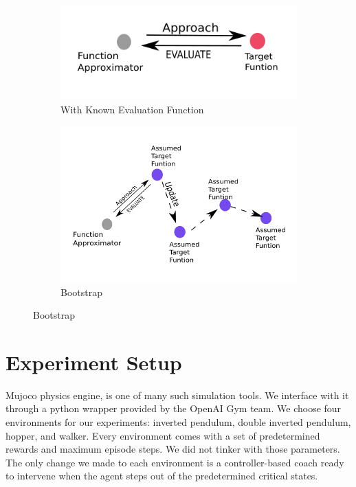 \documentclass[journal]{IEEEtran}
\begin{document}
\begin{figure}
\centering
\begin{subfigure}{0.2\textwidth}
  \centering
  \includegraphics[width=\linewidth]{onego.png}
  \caption{With Known Evaluation Function}
  \label{fig:known}
\end{subfigure}%
\begin{subfigure}{.3\textwidth}
  \centering
  \includegraphics[width=\linewidth]{bootstrap.png}
  \caption{Bootstrap}
  \label{fig:unknown}
\end{subfigure}
\label{fig:bootstrap}
\end{figure}



\section{Experiment Setup}
Mujoco physics engine\cite{6386109}, is one of many such simulation tools. We interface with it through a python wrapper provided by the OpenAI Gym\cite{Brockman2016OpenAIG} team. We choose four environments for our experiments: inverted pendulum, double inverted pendulum, hopper, and walker. Every environment comes with a set of predetermined rewards and maximum episode steps. We did not tinker with those parameters. The only change we made to each environment is a controller-based coach ready to intervene when the agent steps out of the predetermined critical states.
\end{document}
